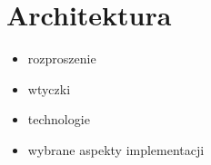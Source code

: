 \section{Architektura}
\begin{itemize}
	\item rozproszenie
	\item wtyczki
	\item technologie
	\item wybrane aspekty implementacji
\end{itemize}